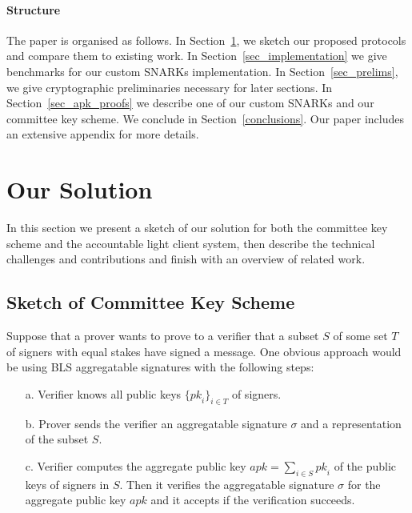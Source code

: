 \paragraph{Structure} The paper is organised as follows.
In Section~\ref{sec:sketch}, we sketch our proposed protocols and compare
them to existing work. In
Section~\ref{sec_implementation} we give benchmarks for our custom SNARKs
implementation.
In Section~\ref{sec_prelims}, we give cryptographic
preliminaries necessary for later sections. In Section~\ref{sec_apk_proofs}
we describe one of our custom SNARKs and our committee key scheme.
 We conclude in Section~\ref{conclusions}. Our paper includes
an extensive appendix for more details.%
\vspace{-0.25cm}
\section{Our Solution}
\label{sec:sketch}
\vspace{-0.1cm}

In this section we present a sketch of our solution for both the committee key scheme and the accountable light client system,
then describe the technical challenges and contributions and finish with an overview of related work.

\vspace{-0.3cm}
\subsection{Sketch of Committee Key Scheme}
\label{sec:lcsketch}
\vspace{-0.1cm}

\noindent Suppose that a prover wants to prove to a verifier that a subset $S$ of some set $T$ of signers with equal stakes have signed a message.
One obvious approach would be using BLS aggregatable signatures with the following steps:

\begin{itemize}
\item[a.] Verifier knows all public keys $\{\mathit{pk}_i\}_{i \in T}$ of signers.%

\item[b.] Prover sends the verifier an aggregatable signature $\sigma$ and a representation of the subset $S$.

\item[c.] Verifier computes the aggregate public key $\mathit{apk}=\sum_{i \in S} \mathit{pk}_i$ of the public keys of signers in $S$.
Then it verifies the aggregatable signature $\sigma$ for the aggregate public key $\mathit{apk}$ and it accepts if the verification succeeds.
\end{itemize}

